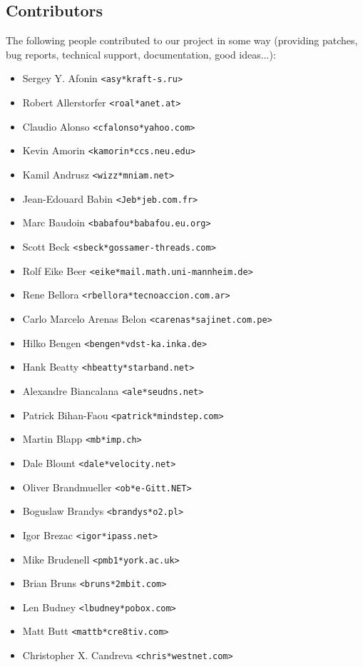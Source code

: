 \documentclass[a4paper,titlepage,12pt]{article}
\newcommand{\email}[1]{\texttt{#1}}
\begin{document}
    \subsection{Contributors}
    The following people contributed to our project in some way (providing
    patches, bug reports, technical support, documentation, good ideas...):
    \begin{itemize}
	\item Sergey Y. Afonin \email{<asy*kraft-s.ru>}
	\item Robert Allerstorfer \email{<roal*anet.at>}
	\item Claudio Alonso \email{<cfalonso*yahoo.com>}
	\item Kevin Amorin \email{<kamorin*ccs.neu.edu>}
	\item Kamil Andrusz \email{<wizz*mniam.net>}
	\item Jean-Edouard Babin \email{<Jeb*jeb.com.fr>}
	\item Marc Baudoin \email{<babafou*babafou.eu.org>}
	\item Scott Beck \email{<sbeck*gossamer-threads.com>}
	\item Rolf Eike Beer \email{<eike*mail.math.uni-mannheim.de>}
	\item Rene Bellora \email{<rbellora*tecnoaccion.com.ar>}
	\item Carlo Marcelo Arenas Belon \email{<carenas*sajinet.com.pe>}
	\item Hilko Bengen \email{<bengen*vdst-ka.inka.de>}
	\item Hank Beatty \email{<hbeatty*starband.net>}
	\item Alexandre Biancalana \email{<ale*seudns.net>}
	\item Patrick Bihan-Faou \email{<patrick*mindstep.com>}
	\item Martin Blapp \email{<mb*imp.ch>}
	\item Dale Blount \email{<dale*velocity.net>}
	\item Oliver Brandmueller \email{<ob*e-Gitt.NET>}
	\item Boguslaw Brandys \email{<brandys*o2.pl>}
	\item Igor Brezac \email{<igor*ipass.net>}
	\item Mike Brudenell \email{<pmb1*york.ac.uk>}
	\item Brian Bruns \email{<bruns*2mbit.com>}
	\item Len Budney \email{<lbudney*pobox.com>}
	\item Matt Butt \email{<mattb*cre8tiv.com>}
	\item Christopher X. Candreva \email{<chris*westnet.com>}

\end{itemize}
\end{document}
